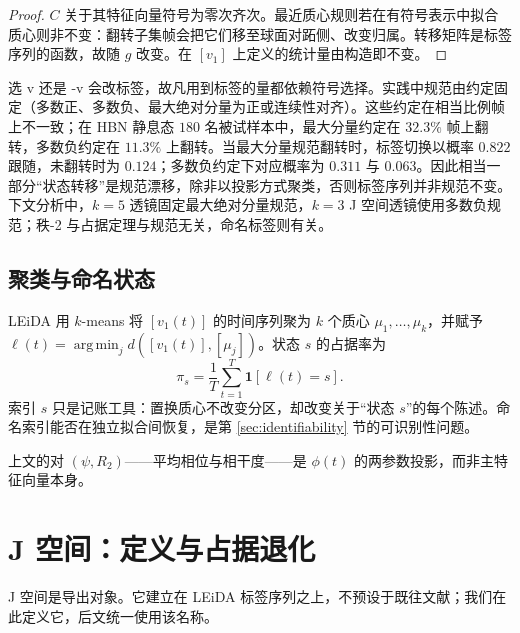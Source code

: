 \documentclass[11pt]{ctexart}
\theoremstyle{definition}
\newcommand{\one}{\mathbf{1}}
\DeclareMathOperator*{\argmin}{arg\,min}
\begin{document}
\begin{proof}
$C$ 关于其特征向量符号为零次齐次。最近质心规则若在有符号表示中拟合质心则非不变：翻转子集帧会把它们移至球面对跖侧、改变归属。转移矩阵是标签序列的函数，故随 $g$ 改变。在 $[v_1]$ 上定义的统计量由构造即不变。
\end{proof}

选 v 还是 -v 会改标签，故凡用到标签的量都依赖符号选择。实践中规范由约定固定（多数正、多数负、最大绝对分量为正或连续性对齐）。这些约定在相当比例帧上不一致；在 HBN 静息态 $180$ 名被试样本中，最大分量约定在 $32.3\%$ 帧上翻转，多数负约定在 $11.3\%$ 上翻转。当最大分量规范翻转时，标签切换以概率 $0.822$ 跟随，未翻转时为 $0.124$；多数负约定下对应概率为 $0.311$ 与 $0.063$。因此相当一部分“状态转移”是规范漂移，除非以投影方式聚类，否则标签序列并非规范不变。下文分析中，$k=5$ 透镜固定最大绝对分量规范，$k=3$ J 空间透镜使用多数负规范；秩-2 与占据定理与规范无关，命名标签则有关。

\subsection{聚类与命名状态}
LEiDA 用 $k$-means 将 $[v_1(t)]$ 的时间序列聚为 $k$ 个质心 $\mu_1,\dots,\mu_k$，并赋予 $\ell(t)=\argmin_j d([v_1(t)],[\mu_j])$。状态 $s$ 的占据率为
\begin{equation}
\pi_s=\frac1T\sum_{t=1}^{T}\one[\ell(t)=s].
\end{equation}
索引 $s$ 只是记账工具：置换质心不改变分区，却改变关于“状态 $s$”的每个陈述。命名索引能否在独立拟合间恢复，是第 \ref{sec:identifiability} 节的可识别性问题。

上文的对 $(\psi,R_2)$——平均相位与相干度——是 $\phi(t)$ 的两参数投影，而非主特征向量本身。

\section{J 空间：定义与占据退化}
\label{sec:jspace}

J 空间是导出对象。它建立在 LEiDA 标签序列之上，不预设于既往文献；我们在此定义它，后文统一使用该名称。
\end{document}
